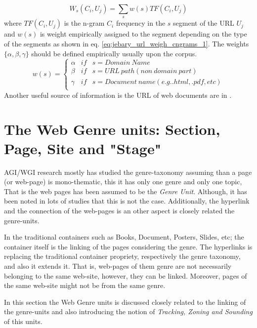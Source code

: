 \begin{equation}\label{eq:jebary_url_weigh_cngrams_1}
	W_{s}(C_{i}, U_{j}) = \sum_{s} w(s) TF(C_{i}, U_{j})
\end{equation}
\noindent
where $TF(C_{i}, U_{j}) $ is the n-gram $C_{i}$ frequency in the $s$ segment of the URL $U_{j}$ and $w(s)$ is weight empirically assigned to the segment depending on the type of the segments as shown in eq. \ref{eq:jebary_url_weigh_cngrams_1}. The weights $\{\alpha,\beta,\gamma\}$ should be defined empirically usually upon the corpus. 
\begin{equation}\label{eq:jebary_url_weigh_cngrams_2}
	w(s) = \left\{
    	\begin{array}{lll}
        	\alpha & if & s = Domain\ Name \\
            \beta & if & s = URL\ path (non\ domain\ part) \\
            \gamma & if & s = Document\ name (e.g. .html, .pdf, etc) \\
         \end{array}
  \right.
\end{equation}
 Another useful source of information is the URL of web documents are in \parencite{abramson2012_URL,jebari2014pure_URL,priyatam2013don_URL}.


\section{The Web Genre units: Section, Page, Site and "Stage"}

AGI/WGI research mostly has studied the genre-taxonomy assuming than a page (or web-page) is mono-thematic, this it has only one genre and only one topic, That is the web pages has been assumed to be the \textit{Genre Unit}. Although, it has been noted in lots of studies that this is not the case. Additionally, the hyperlink and the connection of the web-pages is an other aspect is closely related the genre-units. 

In the  traditional containers such as Books, Document, Posters, Slides, etc; the container itself is the linking of the pages considering the genre. The hyperlinks is replacing the traditional container propriety, respectively the genre taxonomy, and also it extends it. That is, web-pages of them genre are not necessarily belonging to the same web-site, however, they can be linked. Moreover, pages of the same web-site might not be from the same genre. 

In this section the Web Genre units is discussed closely related to the linking of the genre-units and also introducing the notion of \textit{Tracking, Zoning and Sounding} of this units. 

